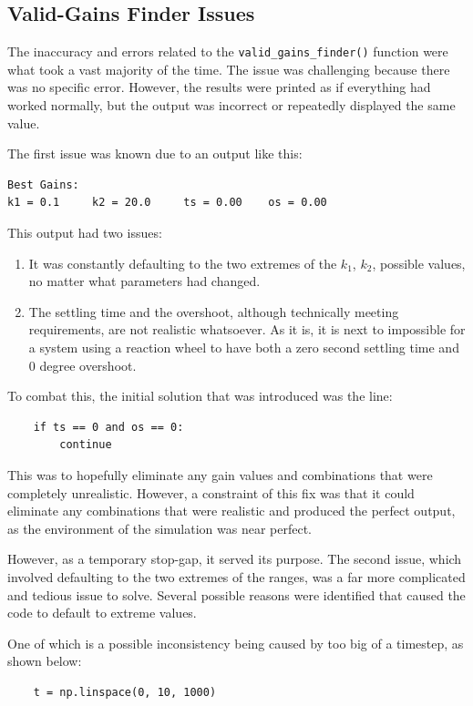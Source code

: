\documentclass{ifacconf}
\begin{document}
\subsection{Valid-Gains Finder Issues}
The inaccuracy and errors related to the \verb|valid_gains_finder()| function were what took a vast majority of the time. The issue was challenging because there was no specific error. However, the results were printed as if everything had worked normally, but the output was incorrect or repeatedly displayed the same value. 

The first issue was known due to an output like this:

\begin{verbatim}
Best Gains:
k1 = 0.1     k2 = 20.0     ts = 0.00    os = 0.00
\end{verbatim}

This output had two issues:

\begin{enumerate}
    \item It was constantly defaulting to the two extremes of the $k_1$, $k_2$, possible values, no matter what parameters had changed.
    \item The settling time and the overshoot, although technically meeting requirements, are not realistic whatsoever. As it is, it is next to impossible for a system using a reaction wheel to have both a zero second settling time and 0 degree overshoot.
\end{enumerate}

To combat this, the initial solution that was introduced was the line:

\begin{verbatim}
    if ts == 0 and os == 0:
        continue       
\end{verbatim}

This was to hopefully eliminate any gain values and combinations that were completely unrealistic. However, a constraint of this fix was that it could eliminate any combinations that were realistic and produced the perfect output, as the environment of the simulation was near perfect.

However, as a temporary stop-gap, it served its purpose. The second issue, which involved defaulting to the two extremes of the ranges, was a far more complicated and tedious issue to solve. Several possible reasons were identified that caused the code to default to extreme values. 

One of which is a possible inconsistency being caused by too big of a timestep, as shown below: 
\begin{verbatim}
    t = np.linspace(0, 10, 1000)
\end{verbatim}
\end{document}
